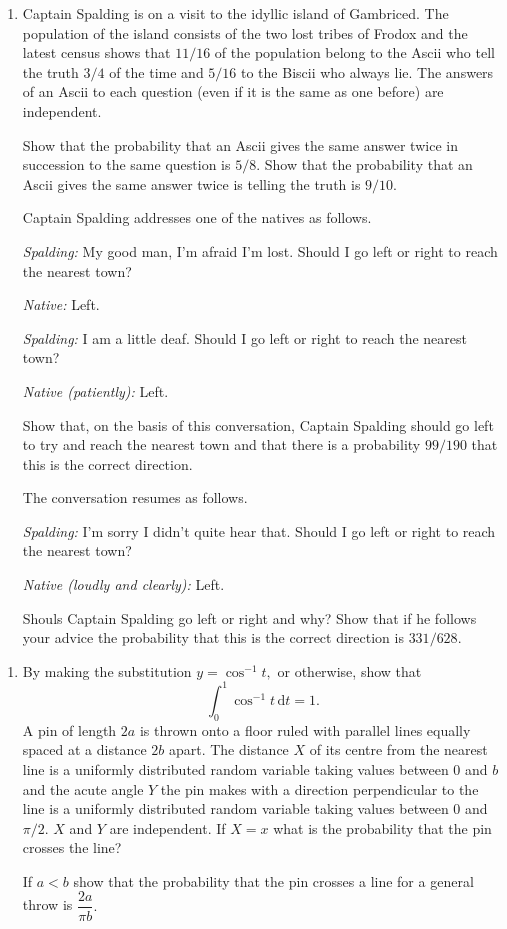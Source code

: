 \documentclass[a4, 11pt]{report}
\newlength{\qspace}
\newcounter{qnumber}
\newenvironment{question}%
 {\vspace{\qspace}
  \begin{enumerate}[\bfseries 1\quad][10]%
    \setcounter{enumi}{\value{qnumber}}%
    \item%
 }
{
  \end{enumerate}
  \filbreak
  \stepcounter{qnumber}
 }
\begin{document}
\begin{question}
Captain Spalding is on a visit to the idyllic island of Gambriced.
The population of the island consists of the two lost tribes of Frodox
and the latest census shows that $11/16$ of the population belong
to the Ascii who tell the truth $3/4$ of the time and $5/16$ to
the Biscii who always lie. The answers of an Ascii to each question
(even if it is the same as one before) are independent. 


Show that the probability that an Ascii gives the same answer twice
in succession to the same question is $5/8$. Show that the probability
that an Ascii gives the same answer twice is telling the truth is
$9/10.$ 


Captain Spalding addresses one of the natives as follows. 


\hspace{1.5em} \textsl{Spalding: }My good man, I'm afraid I'm lost. Should I go left or right to reach the nearest town?\nolinebreak


\hspace{1.5em}\textsl{Native: }Left.


\hspace{1.5em}\textsl{Spalding: }I am a little deaf. Should I go left or right to
reach the nearest town?


\hspace{1.5em}\textsl{Native (patiently): }Left.


Show that, on the basis of this conversation, Captain Spalding should
go left to try and reach the nearest town and that there is a probability
$99/190$ that this is the correct direction. 


The conversation resumes as follows. 


\hspace{1.5em}\textsl{Spalding: }I'm sorry I didn't quite hear that. Should I go
left or right to reach the nearest town?


\hspace{1.5em}\textsl{Native (loudly and clearly): }Left.


Shouls Captain Spalding go left or right and why? Show that if he
follows your advice the probability that this is the correct direction
is $331/628$. 
\end{question}

\begin{question}
By making the substitution $y=\cos^{-1}t,$ or otherwise, show that
\[
\int_{0}^{1}\cos^{-1}t\,\mathrm{d}t=1.
\]
A pin of length $2a$ is thrown onto a floor ruled with parallel lines
equally spaced at a distance $2b$ apart. The distance $X$ of its
centre from the nearest line is a uniformly distributed random variable
taking values between $0$ and $b$ and the acute angle $Y$ the pin
makes with a direction perpendicular to the line is a uniformly distributed
random variable taking values between $0$ and $\pi/2$. $X$ and
$Y$ are independent. If $X=x$ what is the probability that the pin
crosses the line? 


If $a<b$ show that the probability that the pin crosses a line for
a general throw is $\dfrac{2a}{\pi b}.$
\end{question}
\end{document}
